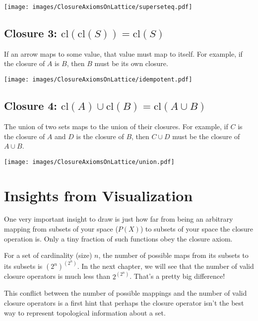 \documentclass{report}
\newcommand{\cl}{\mathrm{cl}}
\begin{document}
\begin{center}
\texttt{[image: images/ClosureAxiomsOnLattice/superseteq.pdf]}
\end{center}

\subsection*{Closure 3: $\cl(\cl(S)) = \cl(S)$}

If an arrow maps to some value, that value must map to itself. For example, if the closure of $A$ is $B$, then $B$ must be its own closure.

\begin{center}
\texttt{[image: images/ClosureAxiomsOnLattice/idempotent.pdf]}
\end{center}
 
\subsection*{Closure 4: $\cl(A)∪\cl(B) = \cl(A∪B)$}

The union of two sets maps to the union of their closures. For example, if $C$ is the closure of $A$ and $D$ is the closure of $B$, then $C \cup D$ must be the closure of $A \cup B$.

\begin{center}
\texttt{[image: images/ClosureAxiomsOnLattice/union.pdf]}
\end{center}

\section*{Insights from Visualization}

One very important insight to draw is just how far from being an arbitrary mapping from subsets of your space ($P(X)$) to subsets of your space the closure operation is. Only a tiny fraction of such functions obey the closure axiom.

For a set of cardinality (size) $n$, the number of possible maps from its subsets to its subsets is $(2^n)^{(2^n)}$. In the next chapter, we will see that the number of valid closure operators is much less than $2^{(2^n)}$. That's a pretty big difference!

This conflict between the number of possible mappings and the number of valid closure operators is a first hint that perhaps the closure operator isn't the best way to represent topological information about a set. 
\end{document}

